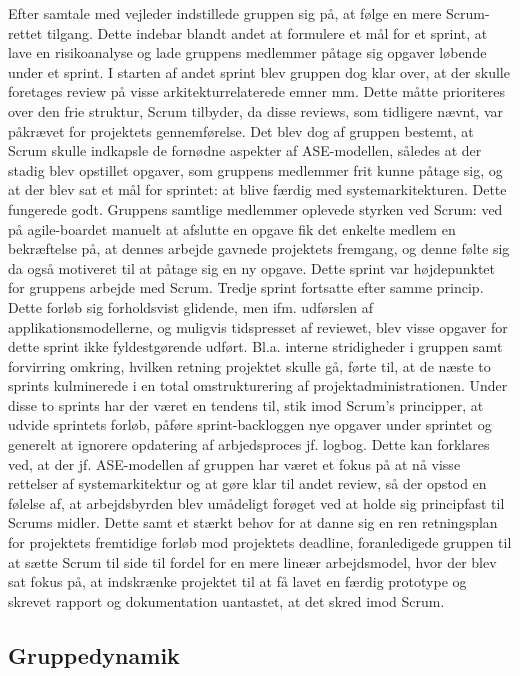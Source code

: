 Efter samtale med vejleder indstillede gruppen sig på, at følge en mere Scrum-rettet tilgang. Dette indebar blandt andet at formulere et mål for et sprint, at lave en risikoanalyse og lade gruppens medlemmer påtage sig opgaver løbende under et sprint. I starten af andet sprint blev gruppen dog klar over, at der skulle foretages review på visse arkitekturrelaterede emner mm. Dette måtte prioriteres over den frie struktur, Scrum tilbyder, da disse reviews, som tidligere nævnt, var påkrævet for projektets gennemførelse. Det blev dog af gruppen bestemt, at Scrum skulle indkapsle de fornødne aspekter af ASE-modellen, således at der stadig blev opstillet opgaver, som gruppens medlemmer frit kunne påtage sig, og at der blev sat et mål for sprintet: at blive færdig med systemarkitekturen. Dette fungerede godt. Gruppens samtlige medlemmer oplevede styrken ved Scrum: ved på agile-boardet manuelt at afslutte en opgave fik det enkelte medlem en bekræftelse på, at dennes arbejde gavnede projektets fremgang, og denne følte sig da også motiveret til at påtage sig en ny opgave. Dette sprint var højdepunktet for gruppens arbejde med Scrum. Tredje sprint fortsatte efter samme princip. Dette forløb sig forholdsvist glidende, men ifm. udførslen af applikationsmodellerne, og muligvis tidspresset af reviewet, blev visse opgaver for dette sprint ikke fyldestgørende udført. Bl.a. interne stridigheder i gruppen samt forvirring omkring, hvilken retning projektet skulle gå, førte til, at de næste to sprints kulminerede i en total omstrukturering af projektadministrationen. Under disse to sprints
har der været en tendens til, stik imod Scrum's principper, at udvide sprintets forløb, påføre sprint-backloggen nye opgaver under sprintet og generelt at ignorere opdatering af arbjedsproces jf. logbog. Dette kan forklares ved, at der jf. ASE-modellen af gruppen har været et fokus på at nå visse rettelser af systemarkitektur og at gøre klar til andet review, så der opstod en følelse af, at arbejdsbyrden blev umådeligt forøget ved at holde sig principfast til Scrums midler. Dette samt
et stærkt behov for at danne sig en ren retningsplan for projektets fremtidige forløb mod projektets deadline, foranledigede gruppen til at sætte Scrum til side til fordel for en mere lineær arbejdsmodel, hvor der blev sat fokus på, at indskrænke projektet til at få lavet en færdig prototype og skrevet rapport og dokumentation uantastet, at det skred imod Scrum.


\subsection{Gruppedynamik}
